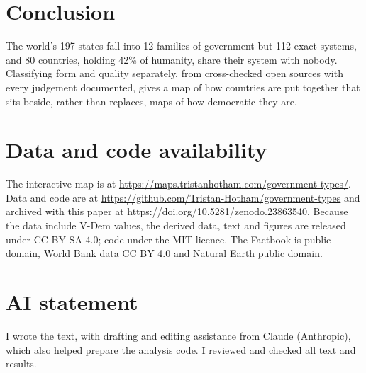\documentclass[11pt,a4paper]{article}
\begin{document}
\section{Conclusion}
The world's 197 states fall into 12 families of government but 112 exact systems, and 80 countries, holding 42\% of humanity, share their system with nobody. Classifying form and quality separately, from cross-checked open sources with every judgement documented, gives a map of how countries are put together that sits beside, rather than replaces, maps of how democratic they are.

\section*{Data and code availability}
The interactive map is at \url{https://maps.tristanhotham.com/government-types/}. Data and code are at \url{https://github.com/Tristan-Hotham/government-types} and archived with this paper at https://doi.org/10.5281/zenodo.23863540. Because the data include V-Dem values, the derived data, text and figures are released under CC BY-SA 4.0; code under the MIT licence. The Factbook is public domain, World Bank data CC BY 4.0 and Natural Earth public domain.

\section*{AI statement}
I wrote the text, with drafting and editing assistance from Claude (Anthropic), which also helped prepare the analysis code. I reviewed and checked all text and results.
\end{document}
